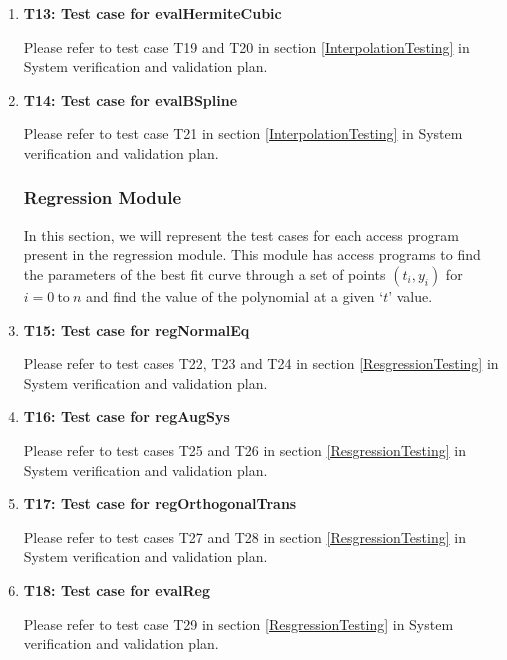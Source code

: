 \documentclass[12pt, titlepage]{article}
\begin{document}
\begin{enumerate}
\item{\textbf{T13: Test case for evalHermiteCubic}}

Please refer to test case T19 and T20 in section \ref{InterpolationTesting} in 
System 
verification and validation plan.


\item{\textbf{T14: Test case for evalBSpline}}

Please refer to test case T21 in section \ref{InterpolationTesting} in System 
verification and validation plan.





\subsubsection{Regression Module}

In this section, we will represent the test cases for each access program 
present in the regression module. This module has access programs to find 
the parameters of the best fit curve through a set of points $(t_i,y_i)$ 
for $i = 0\ \text{to}\ n$ and find the value of the polynomial at a given `$t$' 
value.



\item{\textbf{T15: Test case for regNormalEq}}

Please refer to test cases T22, T23 and T24 in section \ref{ResgressionTesting} 
in 
System verification 
and 
validation plan.


\item{\textbf{T16: Test case for regAugSys}}

Please refer to test cases T25 and T26 in section \ref{ResgressionTesting} in 
System verification 
and 
validation plan.


\item{\textbf{T17: Test case for regOrthogonalTrans}}

Please refer to test cases T27 and T28 in section \ref{ResgressionTesting} in 
System verification 
and 
validation plan.

\item{\textbf{T18: Test case for evalReg}}

Please refer to test case T29 in section \ref{ResgressionTesting} in System 
verification and validation plan.






\end{enumerate}
\end{document}
